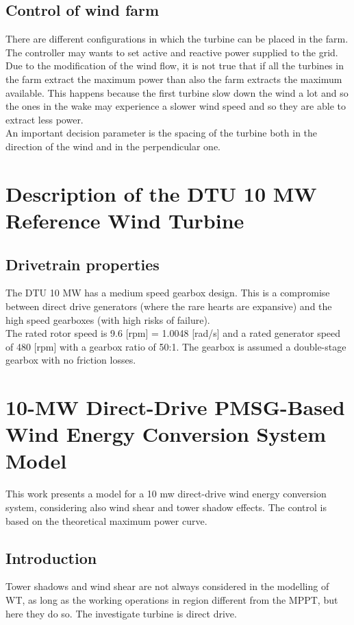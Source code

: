 \documentclass[]{article}
\begin{document}
\subsection{Control of wind farm}
There are different configurations in which the turbine can be placed in the farm. \\
The controller may wants to set active and reactive power supplied to the grid.\\
Due to the modification of the wind flow, it is not true that if all the turbines in the farm extract the maximum power than also the farm extracts the maximum available. This happens because the first turbine slow down the wind a lot and so the ones in the wake may experience a slower wind speed and so they are able to extract less power.\\
An important decision parameter is the spacing of the turbine both in the direction of the wind and in the perpendicular one. 

\section{Description of the DTU 10 MW Reference Wind Turbine}
\subsection{Drivetrain properties}
The DTU 10 MW has a medium speed gearbox design. This is a compromise between direct drive generators (where the rare hearts are expansive) and the high speed gearboxes (with high risks of failure).\\
The rated rotor speed is 9.6 [rpm] = 1.0048 [rad/s] and a rated generator speed of 480 [rpm] with a gearbox ratio of 50:1. The gearbox is assumed a double-stage gearbox with no friction losses.  

\section{10-MW Direct-Drive PMSG-Based Wind Energy Conversion System Model}
This work presents a model for a 10 mw direct-drive wind energy conversion system, considering also wind shear and tower shadow effects. The control is based on the theoretical maximum power curve.\\
\subsection{Introduction}
Tower shadows and wind shear are not always considered in the modelling of WT, as long as the working operations in region different from the MPPT, but here they do so. The investigate turbine is direct drive.
\end{document}
